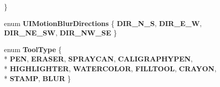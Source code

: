 \begin{DoxyCompactItemize}
 \}
\item 
enum {\bfseries U\-I\-Motion\-Blur\-Directions} \{ {\bfseries D\-I\-R\-\_\-\-N\-\_\-\-S}, 
{\bfseries D\-I\-R\-\_\-\-E\-\_\-\-W}, 
{\bfseries D\-I\-R\-\_\-\-N\-E\-\_\-\-S\-W}, 
{\bfseries D\-I\-R\-\_\-\-N\-W\-\_\-\-S\-E}
 \}
\item 
enum {\bfseries Tool\-Type} \{ \\*
{\bfseries P\-E\-N}, 
{\bfseries E\-R\-A\-S\-E\-R}, 
{\bfseries S\-P\-R\-A\-Y\-C\-A\-N}, 
{\bfseries C\-A\-L\-I\-G\-R\-A\-P\-H\-Y\-P\-E\-N}, 
\\*
{\bfseries H\-I\-G\-H\-L\-I\-G\-H\-T\-E\-R}, 
{\bfseries W\-A\-T\-E\-R\-C\-O\-L\-O\-R}, 
{\bfseries F\-I\-L\-L\-T\-O\-O\-L}, 
{\bfseries C\-R\-A\-Y\-O\-N}, 
\\*
{\bfseries S\-T\-A\-M\-P}, 
{\bfseries B\-L\-U\-R}
 \}
\end{DoxyCompactItemize}
